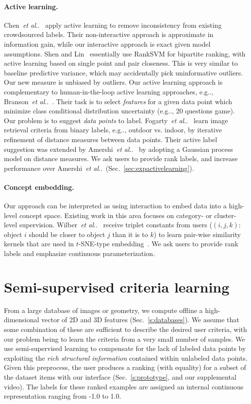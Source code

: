 \documentclass{article}
\makeatletter
\DeclareRobustCommand\onedot{\futurelet\@let@token\@onedot}
\def\@onedot{\ifx\@let@token.\else.\null\fi\xspace}
\def\eg{{e.g}\onedot} \def\Eg{{E.g}\onedot}
\def\etal{\emph{et al}\onedot}
\makeatother
\begin{document}
\paragraph{Active learning.} Chen~\etal~\cite{ChenBennett2013} apply active learning to remove inconsistency from existing crowdsourced labels. Their non-interactive approach is approximate in information gain, while our interactive approach is exact given model assumptions. Shen and Lin~\cite{ShenLin2013} essentially use RankSVM for bipartite ranking, with active learning based on single point and pair closeness. This is very similar to baseline predictive variance, which may accidentally pick uninformative outliers. Our new measure is unbiased by outliers. Our active learning approach is complementary to human-in-the-loop active learning approaches, \eg, Branson~\etal~\cite{BraHorWah14}. Their task is to select \emph{features} for a given data point which minimize class conditional distribution uncertainty (\eg, 20 questions game). Our problem is to suggest \emph{data points} to label. Fogarty~\etal~\cite{FogTanKap08} learn image retrieval criteria from binary labels, \eg, outdoor vs. indoor, by iterative refinement of distance measures between data points. Their active label suggestion was extended by Amershi~\etal~\cite{AmeFogKap11} by adopting a Gaussian process model on distance measures. We ask users to provide rank labels, and increase performance over Amershi~\etal~(Sec.~\ref{sec:expactivelearning}). 

\paragraph{Concept embedding.} Our approach can be interpreted as using interaction to embed data into a high-level concept space. Existing work in this area focuses on category- or cluster-level supervision. Wilber~\etal~\cite{WilKwaKri15} receive triplet constants from users ($(i,j,k)$: object $i$ should be closer to object $j$ than it is to $k$) to learn pair-wise similarity kernels that are used in $t$-SNE-type embedding~\cite{MaaHin08}. We ask users to provide rank labels and emphasize continuous parameterization.

\section{Semi-supervised criteria learning}
\label{sec:semisupervisedlearning}
From a large database of images or geometry, we compute offline a high-dimensional vector of 2D and 3D features (Sec.~\ref{s:databases}). We assume that some combination of these are sufficient to describe the desired user criteria, with our problem being to learn the criteria from a very small number of samples. We use semi-supervised learning to compensate for the lack of labeled data points by exploiting the \emph{rich structural information} contained within unlabeled data points. Given this preprocess, the user produces a ranking (with equality) for a subset of the dataset items with our interface (Sec.~\ref{s:prototype}, and our supplemental video). The labels for these ranked examples are assigned an internal continuous representation ranging from -1.0 to 1.0.
\end{document}
